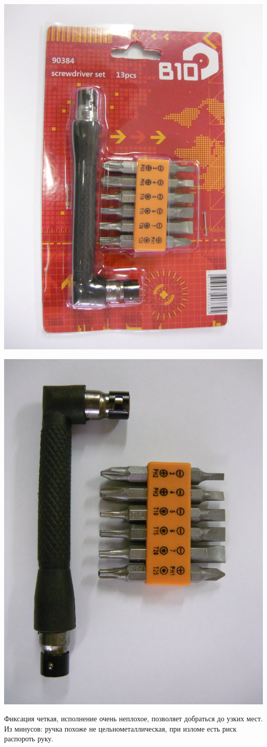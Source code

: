 {\begin{multicols}{2}
\noindent\includegraphics[width=0.9\columnwidth]{00/fig/P1020966.jpg}

\noindent\includegraphics[width=0.9\columnwidth]{00/fig/P1020967.jpg}
\end{multicols}

Фиксация четкая, исполнение очень неплохое, позволяет добраться до узких мест.
Из минусов: ручка похоже не цельнометаллическая, при изломе есть риск 
распороть руку.

}{}
